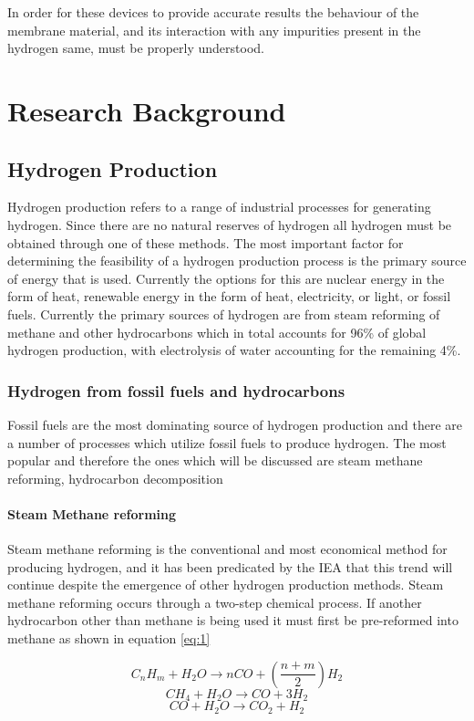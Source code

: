 In order for these devices to provide accurate results the behaviour of the membrane material, and its interaction with any impurities present in the hydrogen same, must be properly understood.  


\section{Research Background}
\subsection{Hydrogen Production}
Hydrogen production refers to a range of industrial processes for generating hydrogen. Since there are no natural reserves of hydrogen all hydrogen must be obtained through one of these methods. The most important factor for determining the feasibility of a hydrogen production process is the primary source of energy that is used. Currently the options for this are nuclear energy in the form of heat, renewable energy in the form of heat, electricity, or light, or fossil fuels. Currently the primary sources of hydrogen are from steam reforming of methane and other hydrocarbons which in total accounts for 96\% of global hydrogen production, with electrolysis of water accounting for the remaining 4\%.
\subsubsection{Hydrogen from fossil fuels and hydrocarbons}
Fossil fuels are the most dominating source of hydrogen production and there are a number of processes which utilize fossil fuels to produce hydrogen. The most popular and therefore the ones which will be discussed are steam methane reforming, hydrocarbon decomposition
\paragraph{Steam Methane reforming}
Steam methane reforming is the conventional and most economical method for producing hydrogen, and it has been predicated by the IEA that this trend will continue despite the emergence of other hydrogen production methods. Steam methane reforming occurs through a two-step chemical process. If another hydrocarbon other than methane is being used it must first be pre-reformed into methane as shown in equation \ref{eq:1}

\begin{equation} \label{eq:1}
    C_n H_m + H_2 O \rightarrow nCO +(\frac{n+m}{2})H_2
\end{equation}
\begin{equation}
    CH_4 + H_2 O \rightarrow CO + 3H_2 
\end{equation}
\begin{equation}
    CO+ H_2 O \rightarrow CO_2 + H_2 
\end{equation}

